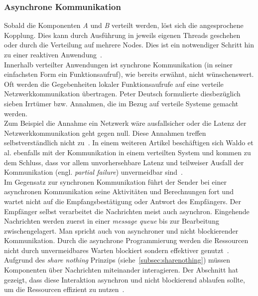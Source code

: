 \subsubsection{Asynchrone Kommunikation}
Sobald die Komponenten \textit{A} und \textit{B} verteilt werden, löst sich die angesprochene Kopplung. Dies kann durch Ausführung in jeweils eigenen Threads geschehen oder durch die Verteilung auf mehrere Nodes. Dies ist ein notwendiger Schritt hin zu einer reaktiven Anwendung~\cite[S.~22]{kuhn_reactive_2015}.\\
Innerhalb verteilter Anwendungen ist synchrone Kommunikation (in seiner einfachsten Form ein Funktionsaufruf), wie bereits erwähnt, nicht wünschenswert. Oft werden die Gegebenheiten lokaler Funktionsaufrufe auf eine verteile Netzwerkkommunikation übertragen. Peter Deutsch formulierte diesbezüglich sieben Irrtümer bzw. Annahmen, die im Bezug auf verteile Systeme gemacht werden.\\
Zum Beispiel die Annahme ein Netzwerk wäre ausfallsicher oder die Latenz der Netzwerkkommunikation geht gegen null. Diese Annahmen treffen selbstverständlich nicht zu~\cite[S.~1]{rotem_fallacies_2008}. In einem weiteren Artikel beschäftigen sich Waldo et al. ebenfalls mit der Kommunikation in einem verteilten System und kommen zu dem Schluss, dass vor allem unvorhersehbare Latenz und teilweiser Ausfall der Kommunikation (engl. \textit{partial failure}) unvermeidbar sind~\cite{waldo_note_1994}.\\
Im Gegensatz zur synchronen Kommunikation führt der Sender bei einer asynchronen Kommunikation seine Aktivitäten und Berechnungen fort und wartet nicht auf die Empfangsbestätigung oder Antwort des Empfängers. Der Empfänger selbst verarbeitet die Nachrichten meist auch asynchron. Eingehende Nachrichten werden zuerst in einer \textit{message queue} bis zur Bearbeitung zwischengelagert. Man spricht auch von asynchroner und nicht blockierender Kommunikation. Durch die asynchrone Programmierung werden die Ressourcen nicht durch unvermeidbares Warten blockiert sondern effektiver genutzt~\cite[S.~48]{kuhn_reactive_2015}.\\

Aufgrund des \textit{share nothing} Prinzips (siehe~\ref{subsec:sharenothing}) müssen Komponenten über Nachrichten miteinander interagieren. Der Abschnitt hat gezeigt, dass diese Interaktion asynchron und nicht blockierend ablaufen sollte, um die Ressourcen effizient zu nutzen~\cite[S.~48~\&~S.~49]{kuhn_reactive_2015}.

\pagebreak

